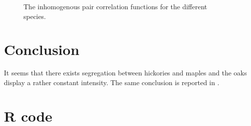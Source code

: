 \documentclass[12pt,a4paper,oneside,article]{memoir}
\begin{document}
\begin{figure}[htbp]
  \begin{adjustwidth}{-2in}{-2in}
	  \centering
  \end{adjustwidth}
  \caption{The inhomogenous pair correlation functions for the different species.}
  \label{fig:ppcfi2}
\end{figure}

\clearpage



\section{Conclusion}

It seems that there exists segregation between hickories and maples and the oaks display
a rather constant intensity. The same conclusion is reported in \cite{perry}.


\printbibliography
\clearpage
\appendix
\section*{R code}


\end{document}
